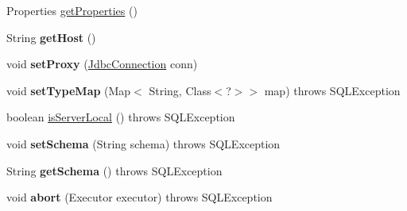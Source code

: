 \begin{DoxyCompactItemize}
\item 
Properties \mbox{\hyperlink{classcom_1_1mysql_1_1cj_1_1jdbc_1_1_connection_wrapper_a76eea5af4534baf71ff0852b0c0f6f9c}{get\+Properties}} ()
\item 
\mbox{\label{classcom_1_1mysql_1_1cj_1_1jdbc_1_1_connection_wrapper_a749196b6111ba521f0920d4ea3b7db81}} 
String {\bfseries get\+Host} ()
\item 
\mbox{\label{classcom_1_1mysql_1_1cj_1_1jdbc_1_1_connection_wrapper_a2b781b548795804db1bd1d82d1b381fb}} 
void {\bfseries set\+Proxy} (\mbox{\hyperlink{interfacecom_1_1mysql_1_1cj_1_1jdbc_1_1_jdbc_connection}{Jdbc\+Connection}} conn)
\item 
\mbox{\label{classcom_1_1mysql_1_1cj_1_1jdbc_1_1_connection_wrapper_aab42e9d0d2398c58f88785a7fcba8369}} 
void {\bfseries set\+Type\+Map} (Map$<$ String, Class$<$?$>$$>$ map)  throws S\+Q\+L\+Exception 
\item 
boolean \mbox{\hyperlink{classcom_1_1mysql_1_1cj_1_1jdbc_1_1_connection_wrapper_afe8fab04e181ccd81e0e5bb3881361cd}{is\+Server\+Local}} ()  throws S\+Q\+L\+Exception 
\item 
\mbox{\label{classcom_1_1mysql_1_1cj_1_1jdbc_1_1_connection_wrapper_aab033f6e889c46495c2b6bff7705d5ae}} 
void {\bfseries set\+Schema} (String schema)  throws S\+Q\+L\+Exception 
\item 
\mbox{\label{classcom_1_1mysql_1_1cj_1_1jdbc_1_1_connection_wrapper_a07ae9ffd465a55ce62711ff353a6242c}} 
String {\bfseries get\+Schema} ()  throws S\+Q\+L\+Exception 
\item 
\mbox{\label{classcom_1_1mysql_1_1cj_1_1jdbc_1_1_connection_wrapper_a9347799039ddf573af01f07409b17d5f}} 
void {\bfseries abort} (Executor executor)  throws S\+Q\+L\+Exception 
\item 
\mbox{\label{classcom_1_1mysql_1_1cj_1_1jdbc_1_1_connection_wrapper_a23b7f1ca38d2fdea8de3a7f0e971233d}} 
$$
\end{DoxyCompactItemize}
